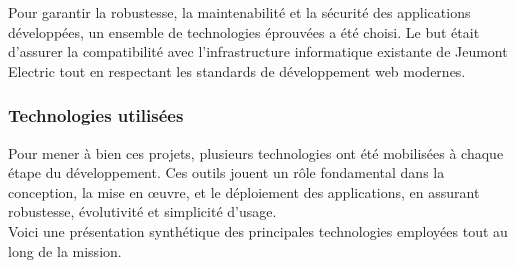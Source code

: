 \documentclass[11pt,a4paper]{article}
\begin{document}
Pour garantir la robustesse, la maintenabilité et la sécurité des applications développées, un ensemble de technologies éprouvées a été choisi. Le but était d'assurer la compatibilité avec l’infrastructure informatique existante de Jeumont Electric tout en respectant les standards de développement web modernes.

\subsubsection{Technologies utilisées}
Pour mener à bien ces projets, plusieurs technologies ont été mobilisées à chaque étape du développement. Ces outils jouent un rôle fondamental dans la conception, la mise en œuvre, et le déploiement des applications, en assurant robustesse, évolutivité et simplicité d’usage. \\
Voici une présentation synthétique des principales technologies employées tout au long de la mission.
\end{document}
